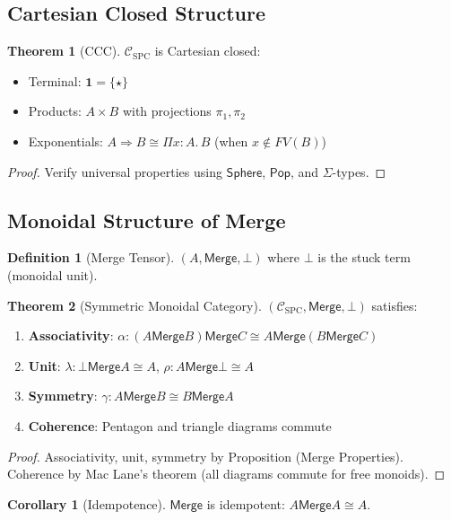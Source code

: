 \documentclass[12pt]{article}
\newcommand{\Sphere}{\mathsf{Sphere}}
\newcommand{\Pop}{\mathsf{Pop}}
\newcommand{\Merge}{\mathsf{Merge}}
\newcommand{\PiT}[3]{\Pi #1 : #2.\, #3}
\theoremstyle{definition}
\newtheorem{definition}{Definition}
\newtheorem{theorem}{Theorem}
\newtheorem{corollary}{Corollary}
\begin{document}
\subsection{Cartesian Closed Structure}
\begin{theorem}[CCC]
$\mathcal{C}_{\text{SPC}}$ is Cartesian closed:
\begin{itemize}
\item Terminal: $\mathbf{1} = \{\star\}$
\item Products: $A \times B$ with projections $\pi_1, \pi_2$
\item Exponentials: $A \Rightarrow B \cong \PiT{x}{A}{B}$ (when $x \notin FV(B)$)
\end{itemize}
\end{theorem}
\begin{proof}
Verify universal properties using $\Sphere$, $\Pop$, and $\Sigma$-types.
\end{proof}

\subsection{Monoidal Structure of Merge}
\begin{definition}[Merge Tensor]
$(A, \Merge, \bot)$ where $\bot$ is the stuck term (monoidal unit).
\end{definition}

\begin{theorem}[Symmetric Monoidal Category]
$(\mathcal{C}_{\text{SPC}}, \Merge, \bot)$ satisfies:
\begin{enumerate}
\item \textbf{Associativity}: $\alpha : (A \Merge B) \Merge C \cong A \Merge (B \Merge C)$
\item \textbf{Unit}: $\lambda : \bot \Merge A \cong A$, $\rho : A \Merge \bot \cong A$
\item \textbf{Symmetry}: $\gamma : A \Merge B \cong B \Merge A$
\item \textbf{Coherence}: Pentagon and triangle diagrams commute
\end{enumerate}
\end{theorem}
\begin{proof}
Associativity, unit, symmetry by Proposition (Merge Properties).
Coherence by Mac Lane's theorem (all diagrams commute for free monoids).
\end{proof}

\begin{corollary}[Idempotence]
$\Merge$ is idempotent: $A \Merge A \cong A$.
\end{corollary}
\end{document}
